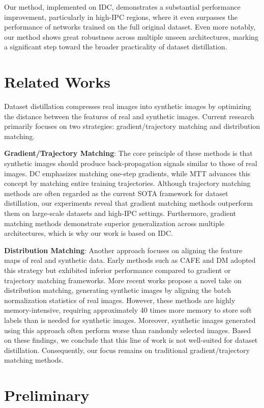 \documentclass{article}
\theoremstyle{plain}
\theoremstyle{definition}
\theoremstyle{remark}
\begin{document}
Our method, implemented on IDC, demonstrates a substantial performance improvement, particularly in high-IPC regions, where it even surpasses the performance of networks trained on the full original dataset. Even more notably, our method shows great robustness across multiple unseen architectures, marking a significant step toward the broader practicality of dataset distillation.


\section{Related Works}
Dataset distillation compresses real images into synthetic images by optimizing the distance between the features of real and synthetic images. Current research primarily focuses on two strategies: gradient/trajectory matching and distribution matching.

\textbf{Gradient/Trajectory Matching}: The core principle of these methods is that synthetic images should produce back-propagation signals similar to those of real images. DC emphasizes matching one-step gradients, while MTT advances this concept by matching entire training trajectories. Although trajectory matching methods are often regarded as the current SOTA framework for dataset distillation, our experiments reveal that gradient matching methods outperform them on large-scale datasets and high-IPC settings. Furthermore, gradient matching methods demonstrate superior generalization across multiple architectures, which is why our work is based on IDC.

\textbf{Distribution Matching}: Another approach focuses on aligning the feature maps of real and synthetic data. Early methods such as CAFE and DM adopted this strategy but exhibited inferior performance compared to gradient or trajectory matching frameworks. More recent works propose a novel take on distribution matching, generating synthetic images by aligning the batch normalization statistics of real images. However, these methods are highly memory-intensive, requiring approximately 40 times more memory to store soft labels than is needed for synthetic images. Moreover, synthetic images generated using this approach often perform worse than randomly selected images. Based on these findings, we conclude that this line of work is not well-suited for dataset distillation. Consequently, our focus remains on traditional gradient/trajectory matching methods.



\section{Preliminary}
\end{document}
